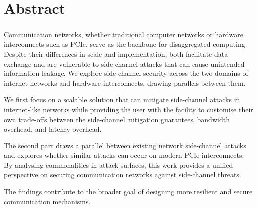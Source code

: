 
\chapter{Abstract}

\paragraph{} Communication networks, whether traditional computer networks or hardware interconnects such as PCIe, serve as the backbone for disaggregated computing. 
Despite their differences in scale and implementation, both facilitate data exchange and are vulnerable to side-channel attacks that can cause unintended information leakage. 
We explore side-channel security across the two domains of internet networks and hardware interconnects, drawing parallels between them. 

We first focus on a scalable solution that can mitigate side-channel attacks in internet-like networks while providing the user with the facility to customise their own trade-offs between the side-channel mitigation guarantees, bandwidth overhead, and latency overhead.

The second part draws a parallel between existing network side-channel attacks and explores whether similar attacks can occur on modern PCIe interconnects.
By analysing commonalities in attack surfaces, this work provides a unified perspective on securing communication networks against side-channel threats.

The findings contribute to the broader goal of designing more resilient and secure communication mechanisms.

\endinput

The first part of this research focuses on mitigating side-channel attacks in traditional networks, proposing defences that minimise information leakage while preserving performance. 

The second part examines interconnects like PCIe, identifying side-channel vulnerabilities and developing detection mechanisms. 